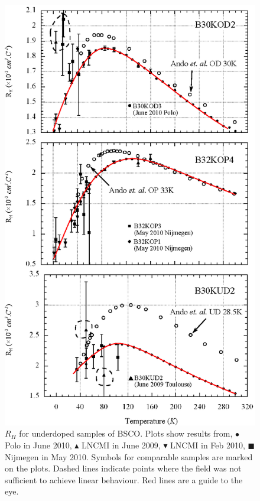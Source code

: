 \begin{figure}[htbp]
	\begin{center}
		\includegraphics[scale=0.9]{Chapter-HallBSCO/Figures/HallIndividual/HallIndividualOP}
		\caption{$R_H$ for underdoped samples of \ac{BSCO}. Plots show results from, $\bullet$ Polo in June 2010, $\blacktriangle$ \ac{LNCMI} in June 2009, $\blacktriangledown$ \ac{LNCMI} in Feb 2010, $\blacksquare$ Nijmegen in May 2010. Symbols for comparable samples are marked on the plots. Dashed lines indicate points where the field was not sufficient to achieve linear behaviour. Red lines are a guide to the eye.}
		\label{Fig:ResH:HallIndividualOP}
	\end{center}
\end{figure}

